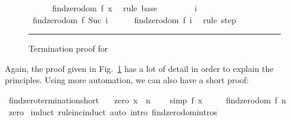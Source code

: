 \begin{isabellebody}
\begin{figure}
\begin{minipage}{0.8\textwidth}
\ \ \ \ \isamarkupfalse%
\ {\isachardoublequoteopen}findzero{\isacharunderscore}dom\ {\isacharparenleft}f{\isacharcomma}\ x{\isacharparenright}{\isachardoublequoteclose}\ \isamarkupfalse%
\ {\isacharparenleft}rule\ base{\isacharparenright}\isanewline
\ \ \isamarkupfalse%
\isanewline
\ \ \ \ \isamarkupfalse%
\ i\ \isamarkupfalse%
\ {\isachardoublequoteopen}findzero{\isacharunderscore}dom\ {\isacharparenleft}f{\isacharcomma}\ Suc\ i{\isacharparenright}{\isachardoublequoteclose}\isanewline
\ \ \ \ \isamarkupfalse%
\ {\isachardoublequoteopen}findzero{\isacharunderscore}dom\ {\isacharparenleft}f{\isacharcomma}\ i{\isacharparenright}{\isachardoublequoteclose}\ \isamarkupfalse%
\ {\isacharparenleft}rule\ step{\isacharparenright}\isanewline
\ \ \isamarkupfalse%
\isanewline
{}\isamarkupfalse%
%
\endisatagproof
{\isafoldproof}%
%
\isadelimproof
%
\endisadelimproof
%
\isamarkupfalse{}
\end{minipage}\vspace{6pt}\hrule
\caption{Termination proof for }\label{findzero_term}
\end{figure}
%
\begin{isamarkuptext}%
Again, the proof given in Fig.~\ref{findzero_term} has a lot of
  detail in order to explain the principles. Using more automation, we
  can also have a short proof:%
\end{isamarkuptext}%
\isamarkuptrue%
\isamarkupfalse%
\ findzero{\isacharunderscore}termination{\isacharunderscore}short{\isacharcolon}\isanewline
\ \ \ zero{\isacharcolon}\ {\isachardoublequoteopen}x\ {\isachargreater}{\isacharequal}\ n{\isachardoublequoteclose}\ \isanewline
\ \ \ {\isacharbrackleft}simp{\isacharbrackright}{\isacharcolon}\ {\isachardoublequoteopen}f\ x\ {\isacharequal}\ {}{\isachardoublequoteclose}\isanewline
\ \ \ {\isachardoublequoteopen}findzero{\isacharunderscore}dom\ {\isacharparenleft}f{\isacharcomma}\ n{\isacharparenright}{\isachardoublequoteclose}\isanewline
%
\isadelimproof
%
\endisadelimproof
%
\isatagproof
{}\isamarkupfalse%
\ zero\isanewline
{}\isamarkupfalse%
\ {\isacharparenleft}induct\ rule{\isacharcolon}inc{\isacharunderscore}induct{\isacharparenright}\ {\isacharparenleft}auto\ intro{\isacharcolon}\ findzero{\isachardot}domintros{\isacharparenright}%
\endisatagproof
{\isafoldproof}%

\end{isabellebody}

